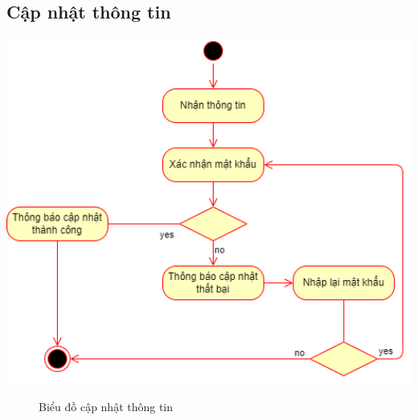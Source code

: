 \subsection{Cập nhật thông tin}
\begin{center}
	\includegraphics[width=1.1\textwidth]{../drawio/activity/updatedata.png}
	\begin{figure}[h]
		\centering
		\caption{Biểu đồ cập nhật thông tin}
	\end{figure}
\end{center}
